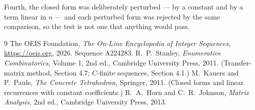 \documentclass[11pt,a4paper]{article}
\theoremstyle{plain}
\theoremstyle{definition}
\begin{document}
Fourth, the closed form was deliberately perturbed --- by a constant and by a term linear in
$n$ --- and each perturbed form was rejected by the same comparison, so the test is not one
that anything would pass.

\begin{thebibliography}{9}
 The OEIS Foundation, \emph{The On-Line Encyclopedia of Integer
Sequences}, \url{https://oeis.org}, 2026. Sequence A224283.
 R.~P.~Stanley, \emph{Enumerative Combinatorics}, Volume 1, 2nd ed.,
Cambridge University Press, 2011. (Transfer-matrix method, Section 4.7; $C$-finite sequences,
Section 4.1.)
 M.~Kauers and P.~Paule, \emph{The Concrete Tetrahedron}, Springer, 2011.
(Closed forms and linear recurrences with constant coefficients.)
 R.~A.~Horn and C.~R.~Johnson, \emph{Matrix Analysis}, 2nd ed., Cambridge
University Press, 2013.
\end{thebibliography}
\end{document}
